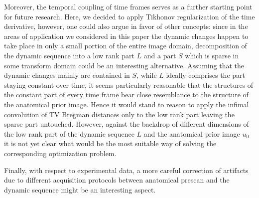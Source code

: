 Moreover, the temporal coupling of time frames serves as a further starting point for future research. 
Here, we decided to apply Tikhonov regularization of the time derivative, however, one could also argue in favor of other concepts: 
since in the areas of application we considered in this paper the dynamic changes happen to take place in only a small portion of the entire image domain, decomposition of the dynamic sequence into a low rank part $L$ and a part $S$ which is sparse in some transform domain \cite{Tremoulheac:lowRankPlusSparsePrior,Otazo:lowRankPlusSparseMatrixDecomposition} could be an interesting alternative. 
Assuming that the dynamic changes mainly are contained in $S$, while $L$ ideally comprises the part staying constant over time, it seems particularly reasonable that the structures of the constant part of every time frame bear close resemblance to the structure of the anatomical prior image. 
Hence it would stand to reason to apply the infimal convolution of TV Bregman distances only to the low rank part leaving the sparse part untouched. 
However, against the backdrop of different dimensions of the low rank part of the dynamic sequence $L$ and the anatomical prior image $u_0$ it is not yet clear what would be the most suitable way of solving the corresponding optimization problem. 

Finally, with respect to experimental data, a more careful correction of artifacts due to different acquisition protocols between anatomical prescan and the dynamic sequence might be an interesting aspect.
